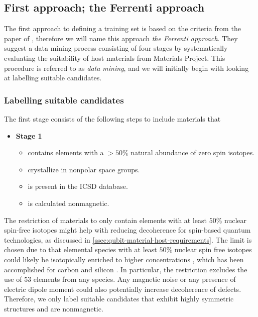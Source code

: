 \subsection{First approach; the Ferrenti approach}

The first approach to defining a training set is based on the criteria from the paper  of \citeauthor{Ferrenti2020} \cite{Ferrenti2020}, therefore we will name this approach \textit{the Ferrenti approach}. They suggest a data mining process consisting of four stages by systematically evaluating the suitability of host materials from Materials Project. This procedure is referred to as \textit{data mining}, and we will initially begin with looking at labelling suitable candidates.

\subsubsection{Labelling suitable candidates}

The first stage consists of the following steps to include materials that
\begin{itemize}
  \item[]{\textbf{Stage 1}}
  \begin{itemize}
  \item contains elements with a $>50\%$ natural abundance of zero spin isotopes.
  \item crystallize in nonpolar space groups.
  \item is present in the ICSD database.
  \item is calculated nonmagnetic.
  \end{itemize}
\end{itemize}

\noindent The restriction of materials to only contain elements with at least $50\%$ nuclear spin-free isotopes might help with reducing decoherence for spin-based quantum technologies, as discussed in \autoref{ssec:qubit-material-host-requirements}.
The limit is chosen due to that elemental species with at least $50\%$ nuclear spin free isotopes could likely be isotopically enriched to higher concentrations \cite{Ferrenti2020}, which has been accomplished for carbon \cite{Markham2011, Balasubramanian2009} and silicon \cite{Tyryshkin2011}. In particular, the restriction excludes the use of $53$ elements from any species. Any magnetic noise or any presence of electric dipole moment could also potentially increase decoherence of defects. Therefore, we only label suitable candidates that exhibit highly symmetric structures and are nonmagnetic.

